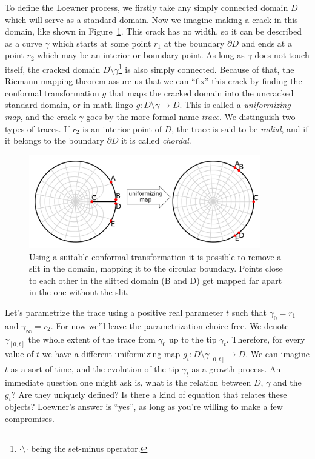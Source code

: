 To define the Loewner process, we firstly take any simply connected domain $D$
which will serve as a standard domain. Now we imagine making a crack in this
domain, like shown in Figure~\ref{fig:diskfix}. This crack has no width, so it
can be described as a curve $\gamma$ which starts at some point $r_1$ at the
boundary $\partial D$ and ends at a point $r_2$ which may be an interior or
boundary point. As long as $\gamma$ does not touch itself, the cracked domain
$D\setminus\gamma$\footnote{$\cdot\setminus\cdot$ being the set-minus
    operator.} is also simply connected. Because of that, the Riemann mapping
theorem assure us that we can ``fix'' this crack by finding the conformal
transformation $g$ that maps the cracked domain into the uncracked standard
domain, or in math lingo $g:D\setminus\gamma\rightarrow D$. This is called a
\textit{uniformizing map}, and the crack  $\gamma$ goes by the more formal name
\textit{trace}. We distinguish two types of traces. If $r_2$ is an interior
point of $D$, the trace is said to be \textit{radial}, and if it belongs to the
boundary $\partial D$ it is called \textit{chordal}.

\begin{figure}[t]
\begin{center}
    \includegraphics[width=0.9\textwidth]{chapters/ch4-sle/figs/diskfix}
\end{center}
\caption{Using a suitable conformal transformation it is possible to remove
    a slit in the domain, mapping it to the circular boundary. Points close
    to each other in the slitted domain (B and D) get mapped far apart in
    the one without the slit.}
\label{fig:diskfix}
\end{figure}


Let's parametrize the trace using a positive real parameter $t$ such that
$\gamma_{0}=r_1$ and $\gamma_{\infty}=r_2$. For now we'll leave the
parametrization choice free. We denote $\gamma_{[0,t]}$ the whole extent of the
trace from $\gamma_0$ up to the tip $\gamma_t$. Therefore, for every value of
$t$ we have a different uniformizing map
$g_t:D\setminus\gamma_{[0,t]}\rightarrow D$. We can imagine $t$ as a sort of
time, and the evolution of the tip $\gamma_t$ as a growth process.
An immediate question one might ask is, what is the relation between $D$,
$\gamma$ and the $g_t$? Are they uniquely defined? Is there a kind of equation
that relates these objects? Loewner's answer is ``yes'', as long as you're
willing to make a few compromises.

